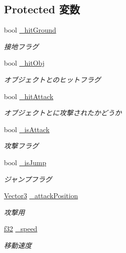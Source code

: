 \subsection*{Protected 変数}
\begin{DoxyCompactItemize}
\item 
bool \hyperlink{class_man_a1761302b9ee56b5ea67ff85a6b1c7804}{\-\_\-hit\-Ground}
\begin{DoxyCompactList}\small\item\em 接地フラグ \end{DoxyCompactList}\item 
bool \hyperlink{class_man_acaae84d59d74953ebb8cd7b09e5faaf0}{\-\_\-hit\-Obj}
\begin{DoxyCompactList}\small\item\em オブジェクトとのヒットフラグ \end{DoxyCompactList}\item 
bool \hyperlink{class_man_a5021ebc7e4ff19d3620f51ccc22d9c6b}{\-\_\-hit\-Attack}
\begin{DoxyCompactList}\small\item\em オブジェクトとに攻撃されたかどうか \end{DoxyCompactList}\item 
bool \hyperlink{class_man_a5b9699d0abb401113a8feef81b515647}{\-\_\-is\-Attack}
\begin{DoxyCompactList}\small\item\em 攻撃フラグ \end{DoxyCompactList}\item 
bool \hyperlink{class_man_adf303aeded2c5094c246d45edd2be7a6}{\-\_\-is\-Jump}
\begin{DoxyCompactList}\small\item\em ジャンプフラグ \end{DoxyCompactList}\item 
\hyperlink{struct_vector3}{Vector3} \hyperlink{class_man_a0df920254c02bae445db9f3a896e3986}{\-\_\-attack\-Position}
\begin{DoxyCompactList}\small\item\em 攻撃用 \end{DoxyCompactList}\item 
\hyperlink{_main_8h_a5f6906312a689f27d70e9d086649d3fd}{f32} \hyperlink{class_man_ab6179d5c87983400d4d6cdd7d0163d86}{\-\_\-speed}
\begin{DoxyCompactList}\small\item\em 移動速度 \end{DoxyCompactList}\item 

\end{DoxyCompactItemize}

